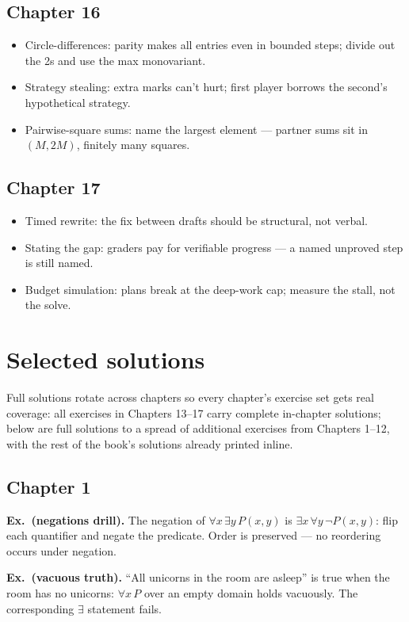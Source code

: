 \section*{Chapter 16}
\begin{itemize}
\item Circle-differences: parity makes all entries even in bounded
steps; divide out the 2s and use the max monovariant.
\item Strategy stealing: extra marks can't hurt; first player borrows
the second's hypothetical strategy.
\item Pairwise-square sums: name the largest element --- partner sums
sit in $(M,2M)$, finitely many squares.
\end{itemize}

\section*{Chapter 17}
\begin{itemize}
\item Timed rewrite: the fix between drafts should be structural, not
verbal.
\item Stating the gap: graders pay for verifiable progress --- a named
unproved step is still named.
\item Budget simulation: plans break at the deep-work cap; measure the
stall, not the solve.
\end{itemize}

\chapter{Selected solutions}

Full solutions rotate across chapters so every chapter's exercise set
gets real coverage: all exercises in Chapters 13--17 carry complete
in-chapter solutions; below are full solutions to a spread of
additional exercises from Chapters 1--12, with the rest of the book's
solutions already printed inline.

\section*{Chapter 1}
\textbf{Ex.~(negations drill).} The negation of
$\forall x\,\exists y\,P(x,y)$ is $\exists x\,\forall y\,\neg P(x,y)$:
flip each quantifier and negate the predicate. Order is preserved ---
no reordering occurs under negation.

\textbf{Ex.~(vacuous truth).} ``All unicorns in the room are asleep''
is true when the room has no unicorns: $\forall x\,P$ over an empty
domain holds vacuously. The corresponding $\exists$ statement fails.


